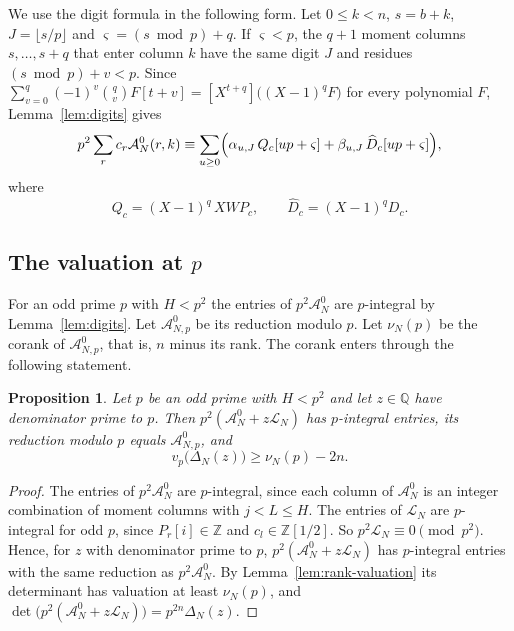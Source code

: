 \documentclass[11pt]{amsart}
\newtheorem{proposition}[theorem]{Proposition}
\theoremstyle{definition}
\theoremstyle{remark}
\numberwithin{equation}{section}
\newcommand{\Z}{\mathbb Z}
\newcommand{\Q}{\mathbb Q}
\newcommand{\cA}{\mathcal A}
\newcommand{\cL}{\mathcal L}
\begin{document}
We use the digit formula in the following form. Let $0\le k<n$, $s=b+k$, $J=\lfloor s/p\rfloor$ and
$\varsigma=(s\bmod p)+q$. If $\varsigma<p$, the $q+1$ moment columns $s,\dots,s+q$ that enter column $k$ have
the same digit $J$ and residues $(s\bmod p)+v<p$. Since
$\sum_{v=0}^q(-1)^v\binom qvF[t+v]=[X^{t+q}]\bigl((X-1)^qF\bigr)$ for every polynomial $F$,
Lemma~\ref{lem:digits} gives
\begin{equation}\label{eq:column-digits}
 p^2\sum_rc_r\cA^0_N(r,k)\equiv\sum_{u\ge0}\Bigl(\alpha_{u,J}\,Q_c[up+\varsigma]+\beta_{u,J}\,\widehat D_c[up+\varsigma]\Bigr),
\end{equation}
where
\begin{equation}\label{eq:Qc}
 Q_c=(X-1)^q\,XWP_c,\qquad \widehat D_c=(X-1)^qD_c .
\end{equation}

\subsection{The valuation at $p$}
For an odd prime $p$ with $H<p^2$ the entries of $p^2\cA^0_N$ are $p$-integral by Lemma~\ref{lem:digits}.
Let $\cA^0_{N,p}$ be its reduction modulo $p$. Let $\nu_N(p)$ be the corank of $\cA^0_{N,p}$, that is, $n$
minus its rank. The corank enters through the following statement.

\begin{proposition}\label{prop:valuation}
Let $p$ be an odd prime with $H<p^2$ and let $z\in\Q$ have denominator prime to $p$. Then
$p^2(\cA^0_N+z\cL_N)$ has $p$-integral entries, its reduction modulo $p$ equals $\cA^0_{N,p}$, and
\[
 v_p\bigl(\Delta_N(z)\bigr)\ge\nu_N(p)-2n .
\]
\end{proposition}

\begin{proof}
The entries of $p^2\cA^0_N$ are $p$-integral, since each column of $\cA^0_N$ is an integer combination of
moment columns with $j<L\le H$. The entries of $\cL_N$ are $p$-integral for odd $p$, since $P_r[i]\in\Z$
and $c_l\in\Z[1/2]$. So $p^2\cL_N\equiv0\pmod{p^2}$. Hence, for $z$ with denominator prime to $p$,
$p^2(\cA^0_N+z\cL_N)$ has $p$-integral entries with the same reduction as $p^2\cA^0_N$. By
Lemma~\ref{lem:rank-valuation} its determinant has valuation at least $\nu_N(p)$, and
$\det\bigl(p^2(\cA^0_N+z\cL_N)\bigr)=p^{2n}\Delta_N(z)$.
\end{proof}
\end{document}
